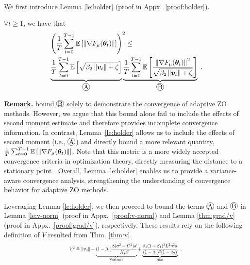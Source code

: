 We first introduce Lemma \ref{le:holder} (proof in Appx.~\ref{proof:holder}).
\begin{lemma}\label{le:holder}
$\forall{t}\geq1$, we have that
\begin{equation}
\begin{aligned}
&\left(\frac{1}{T}\sum_{t=0}^{T-1}\E\left[\left\|\nabla
F_{\mu}(\vtheta_t)\right\|\right]\right)^2 \leq \\
& \underbrace{\frac{1}{T}\sum_{t=0}^{T-1} \E\left[\sqrt{\beta_2\left\|\vv_{t}\right\|+\zeta}\right]}_{\circled{A}}\underbrace{\frac{1}{T}\sum_{t=0}^{T-1}\E\left[\frac{\left\|\nabla
F_{\mu}(\vtheta_{t})\right\|^2}{\sqrt{\beta_2\left\|\vv_{t}\right\|+\zeta}}\right]}_{\circled{B}} \ .
\end{aligned}
\end{equation}
\end{lemma}
\textbf{Remark.} \citet{zo-adamm, nazari2020adaptive} bound $\circled{B}$ solely to demonstrate the convergence of adaptive ZO methods. However, we argue that this bound alone fail to include the effects of second moment estimate and therefore provides incomplete convergence information. In contrast, Lemma~\ref{le:holder} allows us to include the effects of second moment (i.e., $\circled{A}$) and directly bound a more relevant quantity, $\frac{1}{T}\sum_{t=0}^{T-1}\mathbb{E}\left[\left\|\nabla F_{\mu}({\bm{\theta}}_t)\right\|\right]$. Note that this metric is a more widely accepted convergence criteria in optimization theory, directly measuring the distance to a stationary point \citep{lower-bound, zhang2024convergence}. 
Overall, Lemma \ref{le:holder} enables us to provide a variance-aware convergence analysis, strengthening the understanding of convergence behavior for adaptive ZO methods.

Leveraging Lemma \ref{le:holder}, we then proceed to bound the terms $\circled{A}$ and $\circled{B}$ in Lemma \ref{le:v-norm} (proof in Appx.~\ref{proof:v-norm}) and Lemma \ref{thm:grad/v} (proof in Appx.~\ref{proof:grad/v}), respectively. These results rely on the following definition of $V$ resulted from Thm. \ref{thm:v}.
\begin{equation}\label{eq:V2}
\resizebox{0.5\textwidth}{!}{
$V^2 \triangleq \left\|\vv_0\right\| + \underbrace{(1-\beta_1)\frac{8(\sigma^2 + C^2)d}{K\mu^2}}_{\text{Variance}} + \underbrace{\frac{\beta_1(1+\beta_1)^2L^2\eta^2d}{(1 - \beta_1)^2(1 - \beta_2)}}_{\text{Bias}}$ \ .
}
\end{equation}

